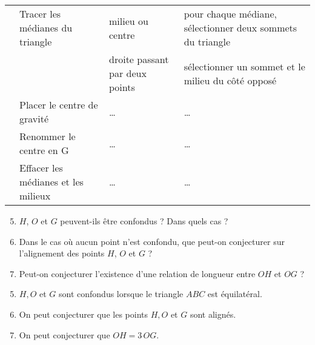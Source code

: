 \begin{enigme}
\begin{tabular}{|cp{5.5cm}|p{4.5cm}|p{5cm}|}
         & Tracer les médianes du triangle  &  milieu ou centre & pour chaque médiane, sélectionner deux sommets du triangle \\
         & & droite passant par deux points & sélectionner un sommet et le milieu du côté opposé \\
         & Placer le centre de gravité & \dots & \dots \\
         & Renommer le centre en G & \dots & \dots \\
         & Effacer les médianes et les milieux & \dots & \dots \\
         \hline
      \end{tabular}
   \bigskip
   
   \partie[constatations]
      \begin{enumerate}
      \setcounter{enumi}{4}
         \item $H$, $O$ et $G$ peuvent-ils être confondus ? Dans quels cas ? \par \medskip
            \pointilles \medskip
         \item Dans le cas où aucun point n'est confondu, que peut-on conjecturer sur l'alignement des points $H$, $O$ et $G$ ? \par \medskip
            \pointilles \medskip 
          \item Peut-on conjecturer l'existence d'une relation de longueur entre $OH$ et $OG$ ? \par \medskip
            \pointilles
      \end{enumerate} 
\end{enigme}

\begin{corrige}
   \begin{enumerate}
   \setcounter{enumi}{4}
      \item $H, O$ et $G$ sont confondus lorsque {\blue le triangle $ABC$ est équilatéral}.
      \item On peut conjecturer que {\blue les points $H, O$ et $G$ sont alignés}.
      \item On peut conjecturer que {\blue $OH =3\,OG$}.
   \end{enumerate}
\end{corrige}

